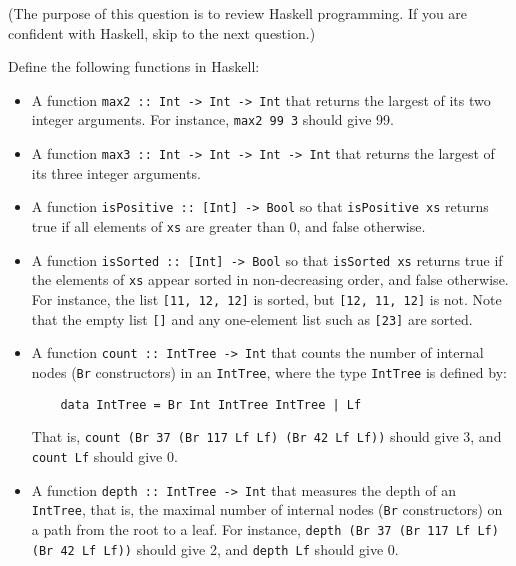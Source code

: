 \documentclass[a4paper]{article}
\begin{document}
\begin{exercise}\label{exer-fsharp-functions}
(The purpose of this question is to review Haskell programming. If you are confident with Haskell, skip to the next question.)

  Define the following functions in Haskell: 

\begin{itemize}
\item A function \texttt{max2 ::\ Int -> Int -> Int} that returns the
  largest of its two integer arguments.  For instance, \texttt{max2 99
    3} should give 99.
  
\item A function \texttt{max3 ::\ Int -> Int -> Int -> Int} that returns
  the largest of its three integer arguments.
  
\item A function \texttt{isPositive ::\ [Int] -> Bool} so that
  \texttt{isPositive xs} returns true if all elements of \texttt{xs}
  are greater than 0, and false otherwise.
  
\item A function \texttt{isSorted ::\ [Int] -> Bool} so that
  \texttt{isSorted xs} returns true if the elements of \texttt{xs}
  appear sorted in non-decreasing order, and false otherwise.  For
  instance, the list \texttt{[11, 12, 12]} is sorted, but \texttt{[12,
    11, 12]} is not.  Note that the empty list \texttt{[]} and any
  one-element list such as \texttt{[23]} are sorted.
  
\item A function \texttt{count ::\ IntTree -> Int} that counts the
  number of internal nodes (\texttt{Br} constructors) in an
  \texttt{IntTree}, where the type \texttt{IntTree} is defined by:
  {\codesetup\begin{verbatim}
    data IntTree = Br Int IntTree IntTree | Lf \end{verbatim}}
  That is, \texttt{count (Br 37 (Br 117
    Lf Lf) (Br 42 Lf Lf))} should give 3, and \texttt{count Lf}
  should give 0.
  
\item A function \texttt{depth ::\ IntTree -> Int} that measures the
  depth of an \texttt{IntTree}, that is, the maximal number of
  internal nodes (\texttt{Br} constructors) on a path from the root to
  a leaf.  For instance, \texttt{depth (Br 37 (Br 117
    Lf Lf) (Br 42 Lf Lf))} should give 2, and \texttt{depth Lf} should give
  0.
\end{itemize}
\end{exercise}
\end{document}
